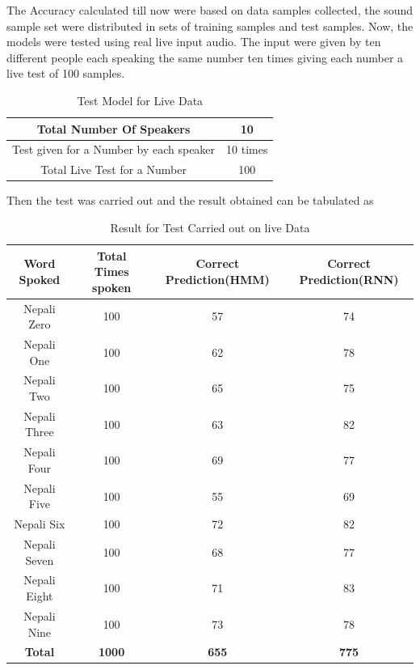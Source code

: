 The Accuracy calculated till now were based on data samples collected, the sound sample set were distributed in sets of training samples and test samples. Now, the models were tested using real live input audio. The input were given by ten different people each speaking the same number ten times giving each number a live test of 100 samples.

\begin{center}
	\begin {table}[h]
	\begin{center}
		
		\begin{tabular}{ |c|c| } 
			\hline
			Total Number Of Speakers & 10  \\ 
			\hline
			Test given for a Number by each speaker & 10 times \\ 
			\hline
			Total Live Test for a Number & 100  \\ 
			\hline
		\end{tabular}
		\caption{Test Model for Live Data}
	\end{center}
\end{table}
\end{center}

Then the test was carried out and the result obtained can be tabulated as

\begin{center}
	\begin {table}[h]
	\begin{center}
		
		\begin{tabular}{ |c|c|c|c| } 
			\hline
			Word Spoked & Total Times spoken & Correct Prediction(HMM) & Correct Prediction(RNN)    \\ 
			\hline
			Nepali Zero & 100 & 57 & 74  \\
			\hline
			Nepali One & 100 & 62 & 78 \\
			\hline
			Nepali Two & 100 & 65 & 75  \\
			\hline
			Nepali Three & 100 & 63 & 82  \\
			\hline
			Nepali Four & 100 & 69 & 77  \\
			\hline
			Nepali Five & 100 & 55 & 69 \\
			\hline
			Nepali Six & 100 & 72 & 82 \\
			\hline
			Nepali Seven & 100 & 68 & 77 \\ 
			\hline
			Nepali Eight & 100 & 71 & 83  \\
			\hline
			Nepali Nine & 100 & 73 &  78 \\
			\hline
			\textbf{Total} & \textbf{1000} & \textbf{655} &  \textbf{775} \\
			\hline
			
		\end{tabular}
		\caption{Result for Test Carried out on live Data}
	\end{center}
\end{table}
\end{center}

